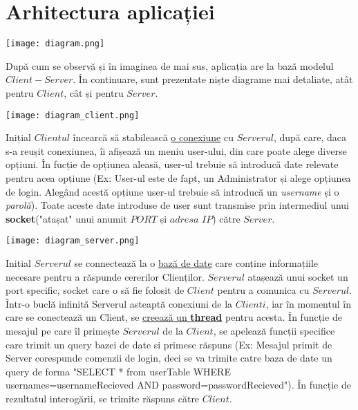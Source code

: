 \documentclass{article}
\begin{document}
\section{Arhitectura aplicației}
        \begin{center}
		\texttt{[image: diagram.png]}
            \label{sec:general}
	\end{center}
 După cum se observă și în imaginea de mai sus, aplicația are la bază modelul $Client-Server$.
 În continuare, sunt prezentate niște diagrame mai detaliate, atât pentru $Client$, cât și pentru $Server$.\\
 \begin{center}
		\texttt{[image: diagram\_client.png]}
            \label{sec:client}
	\end{center}
 Inițial $Clientul$ încearcă să stabilească \hyperlink{sec:detailsConnect}{o conexiune} cu $Serverul$, după care, daca s-a reușit conexiunea, îi afișează un meniu user-ului, din care poate alege diverse opțiuni.
 În fucție de opțiunea aleasă, user-ul trebuie să introducă date relevate pentru acea opțiune 
 (Ex: User-ul este de fapt, un Administrator și alege opțiunea de login. Alegând acestă opțiune user-ul trebuie să introducă un \textit{username} și o \textit{parolă}).
 Toate aceste date introduse de user sunt transmise prin intermediul unui \textbf{socket}("atașat" unui anumit $PORT$ și $adresa$ $IP$) către $Server$.
 \begin{center}
		\texttt{[image: diagram\_server.png]}
            \label{sec:server}
	\end{center}
 Inițial $Serverul$ se connectează la o \hyperref[sec:ServerDataBase]{bază de date} care conține informațiile necesare pentru a răspunde cererilor Clienților.
 $Serverul$ atașează unui socket un port specific, socket care o să fie folosit de $Client$ pentru a comunica cu $Serverul$. 
 Într-o buclă infinită Serverul asteaptă conexiuni de la $Clienti$, iar în momentul în care se conectează un Client, se \hyperlink{sec:ServerCreateThread}{creează un \textbf{thread}} pentru acesta.
 În funcție de mesajul pe care îl primește $Serverul$ de la $Client$, se apelează funcții specifice care trimit un query bazei de date si primesc răspuns
 (Ex: Mesajul primit de Server corespunde comenzii de login, deci se va trimite catre baza de date un query de forma 
 "SELECT * from userTable WHERE usernames=usernameRecieved AND password=passwordRecieved").
 În funcție de rezultatul interogării, se trimite răspuns către $Client$.
\end{document}
